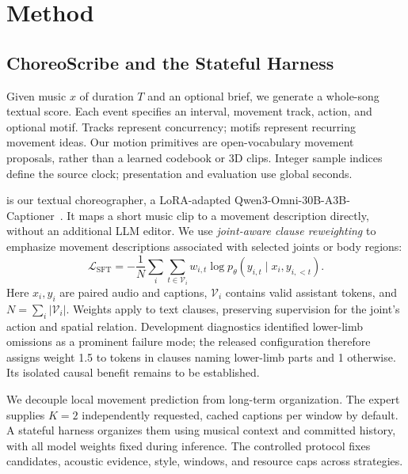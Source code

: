 \section{Method}
\label{sec:method}

\subsection{ChoreoScribe and the Stateful Harness}
Given music $x$ of duration $T$ and an optional brief, we generate a whole-song textual score. Each event specifies an interval, movement track, action, and optional motif. Tracks represent concurrency; motifs represent recurring movement ideas. Our motion primitives are open-vocabulary movement proposals, rather than a learned codebook or 3D clips. Integer sample indices define the source clock; presentation and evaluation use global seconds.

\captioner is our textual choreographer, a LoRA-adapted
Qwen3-Omni-30B-A3B-Captioner~\cite{qwen3omni}. It maps a short music clip
to a movement description directly, without an additional LLM editor.
We use \emph{joint-aware clause reweighting} to emphasize movement
descriptions associated with selected joints or body regions:
\begin{equation}
 \mathcal{L}_{\mathrm{SFT}}
 =-\frac{1}{N}\sum_i\sum_{t\in\mathcal V_i}
 w_{i,t}\log p_\theta(y_{i,t}\mid x_i,y_{i,<t}).
\end{equation}
Here $x_i,y_i$ are paired audio and captions, $\mathcal V_i$ contains
valid assistant tokens, and $N=\sum_i|\mathcal V_i|$.
Weights apply to text clauses, preserving supervision for the joint's
action and spatial relation. Development diagnostics identified
lower-limb omissions as a prominent failure mode; the released
configuration therefore assigns weight 1.5 to tokens in clauses naming
lower-limb parts and 1 otherwise. Its isolated causal benefit remains
to be established.

We decouple local movement prediction from long-term organization. The expert supplies $K=2$ independently requested, cached captions per window by default. A stateful harness organizes them using musical context and committed history, with all model weights fixed during inference. The controlled protocol fixes candidates, acoustic evidence, style, windows, and resource caps across strategies.

